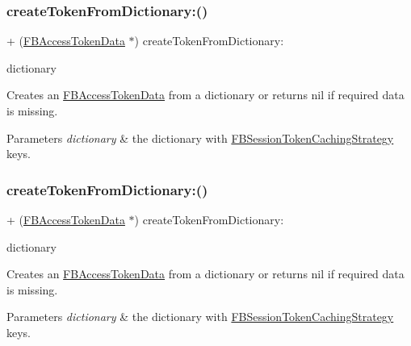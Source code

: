 \subsubsection{\texorpdfstring{create\+Token\+From\+Dictionary\+:()}{createTokenFromDictionary:()}\hspace{0.1cm}{\footnotesize\ttfamily [4/5]}}
{\footnotesize\ttfamily + (\hyperlink{interfaceFBAccessTokenData}{F\+B\+Access\+Token\+Data} $\ast$) create\+Token\+From\+Dictionary\+: \begin{DoxyParamCaption}\item[{(N\+S\+Dictionary $\ast$)}]{dictionary }\end{DoxyParamCaption}}

Creates an \hyperlink{interfaceFBAccessTokenData}{F\+B\+Access\+Token\+Data} from a dictionary or returns nil if required data is missing. 
\begin{DoxyParams}{Parameters}
{\em dictionary} & the dictionary with \hyperlink{interfaceFBSessionTokenCachingStrategy}{F\+B\+Session\+Token\+Caching\+Strategy} keys. \\
\hline
\end{DoxyParams}
\mbox{\label{interfaceFBAccessTokenData_a0a756bdb60ce1b81cd4dbc61943315a9}} 
\subsubsection{\texorpdfstring{create\+Token\+From\+Dictionary\+:()}{createTokenFromDictionary:()}\hspace{0.1cm}{\footnotesize\ttfamily [5/5]}}
{\footnotesize\ttfamily + (\hyperlink{interfaceFBAccessTokenData}{F\+B\+Access\+Token\+Data} $\ast$) create\+Token\+From\+Dictionary\+: \begin{DoxyParamCaption}\item[{(N\+S\+Dictionary $\ast$)}]{dictionary }\end{DoxyParamCaption}}

Creates an \hyperlink{interfaceFBAccessTokenData}{F\+B\+Access\+Token\+Data} from a dictionary or returns nil if required data is missing. 
\begin{DoxyParams}{Parameters}
{\em dictionary} & the dictionary with \hyperlink{interfaceFBSessionTokenCachingStrategy}{F\+B\+Session\+Token\+Caching\+Strategy} keys. \\
\hline
\end{DoxyParams}
\mbox{\label{interfaceFBAccessTokenData_a3c27c994504eb470de2aa02ce71ab3d5}} 
